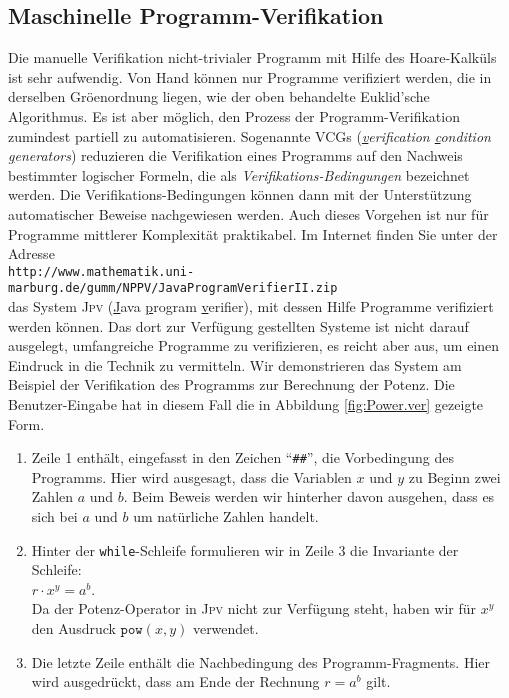 \subsection{Maschinelle Programm-Verifikation}
Die manuelle Verifikation nicht-trivialer Programm mit Hilfe des Hoare-Kalk\"uls ist sehr
aufwendig.  Von Hand k\"onnen nur Programme verifiziert werden, die in derselben
Gr\"o\3enordnung liegen, wie der oben behandelte Euklid'sche Algorithmus.  Es ist aber
m\"oglich, den Prozess der Programm-Verifikation zumindest partiell zu automatisieren.
Sogenannte VCGs (\emph{\underline{v}erification \underline{c}ondition
  \underline{g}enerators}) reduzieren die Verifikation eines Programms auf den Nachweis
bestimmter logischer Formeln, die als \emph{Verifikations-Bedingungen} bezeichnet werden.
Die Verifikations-Bedingungen k\"onnen dann mit der Unterst\"utzung automatischer Beweise
nachgewiesen werden.  Auch dieses Vorgehen ist nur f\"ur Programme mittlerer Komplexit\"at
praktikabel.  Im Internet finden Sie unter der Adresse
\\[0.2cm]
\hspace*{1.3cm}
\texttt{http://www.mathematik.uni-marburg.de/gumm/NPPV/JavaProgramVerifierII.zip}
\\[0.2cm]
das System \textsc{Jpv} (\underline{J}ava \underline{p}rogram \underline{v}erifier), 
mit dessen Hilfe Programme verifiziert werden k\"onnen.  Das dort zur Verf\"ugung
gestellten Systeme ist nicht darauf ausgelegt, umfangreiche Programme zu verifizieren, es
reicht aber aus, um einen Eindruck in die Technik zu vermitteln.  Wir demonstrieren das
System am Beispiel der Verifikation des Programms zur Berechnung der Potenz.  Die
Benutzer-Eingabe hat in diesem Fall die in Abbildung \ref{fig:Power.ver} gezeigte Form.
\begin{enumerate}
\item Zeile 1 enth\"alt, eingefasst in den Zeichen ``\texttt{\#\#}'', die Vorbedingung
      des Programms. Hier wird ausgesagt, dass die Variablen $x$ und $y$ zu Beginn
      zwei Zahlen $a$ und $b$.  Beim Beweis werden wir hinterher davon ausgehen, dass
      es sich bei $a$ und $b$ um nat\"urliche Zahlen handelt.
\item Hinter der \texttt{while}-Schleife formulieren wir in Zeile 3 die Invariante der Schleife:
      \\[0.2cm]
      \hspace*{1.3cm}
      $r \cdot x^y = a^b$.
      \\[0.2cm]
      Da der Potenz-Operator in \textsc{Jpv} nicht zur Verf\"ugung steht, haben wir f\"ur
      $x^y$ den Ausdruck $\texttt{pow}(x,y)$ verwendet.
\item Die letzte Zeile enth\"alt die Nachbedingung des Programm-Fragments.  Hier wird
      ausgedr\"uckt, dass am Ende der Rechnung $r = a^b$ gilt.
\end{enumerate}

